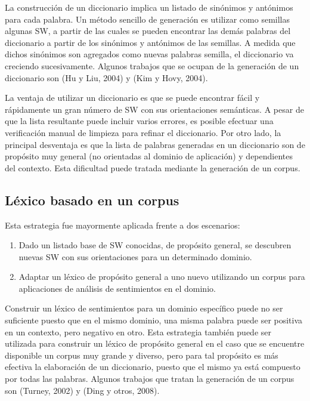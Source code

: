 {La construcci\'on de un diccionario implica un listado de sin\'onimos y ant\'onimos para cada palabra. Un m\'etodo sencillo de generaci\'on es utilizar como semillas algunas SW, a partir de las cuales se pueden encontrar las dem\'as palabras del diccionario a partir de los sin\'onimos y ant\'onimos de las semillas. A medida que dichos sin\'onimos son agregados como nuevas palabras semilla, el diccionario va creciendo sucesivamente. Algunos trabajos que se ocupan de la generaci\'on de un diccionario son (Hu y Liu, 2004) y (Kim y Hovy, 2004).
\newline

La ventaja de utilizar un diccionario es que se puede encontrar f\'acil y r\'apidamente un gran n\'umero de SW con sus orientaciones sem\'anticas. A pesar de que la lista resultante puede incluir varios errores, es posible efectuar una verificaci\'on manual de limpieza para refinar el diccionario. Por otro lado, la principal desventaja es que la lista de palabras generadas en un diccionario son de prop\'osito muy general (no orientadas al dominio de aplicaci\'on) y dependientes del contexto. Esta dificultad puede tratada mediante la generaci\'on de un corpus.

\subsection{L\'exico basado en un corpus}

Esta estrategia fue mayormente aplicada frente a dos escenarios:

\begin{enumerate}
\item Dado un listado base de SW conocidas, de prop\'osito general, se descubren nuevas SW con sus orientaciones para un determinado dominio.
\item Adaptar un l\'exico de prop\'osito general a uno nuevo utilizando un corpus para aplicaciones de an\'alisis de sentimientos en el dominio.
\end{enumerate}
Construir un l\'exico de sentimientos para un dominio espec\'ifico puede no ser suficiente puesto que en el mismo dominio, una misma palabra puede ser positiva en un contexto, pero negativo en otro. Esta estrategia tambi\'en puede ser utilizada para construir un l\'exico de prop\'osito general en el caso que se encuentre disponible un corpus muy grande y diverso, pero para tal prop\'osito es m\'as efectiva la elaboraci\'on de un diccionario, puesto que el mismo ya est\'a compuesto por todas las palabras. Algunos trabajos que tratan la generaci\'on de un corpus son (Turney, 2002) y (Ding y otros, 2008). 

}

